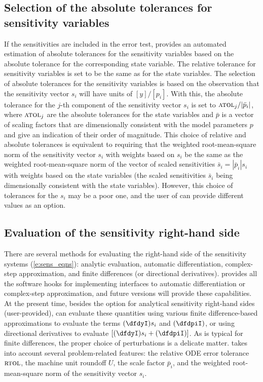 \subsection{Selection of the absolute tolerances for sensitivity variables}
If the sensitivities are included in the error
test, {\cvodes} provides an
automated estimation of absolute tolerances for the sensitivity variables 
based on the absolute tolerance for the corresponding state variable.
The relative tolerance for sensitivity variables is set to be the same as for 
the state variables. The selection of absolute tolerances for the sensitivity 
variables is based on the observation that the sensitivity vector $s_i$ will have 
units of $[y]/[p_i]$.
With this, the absolute tolerance for the $j$-th component of the sensitivity
vector $s_i$ is set to ${\mbox{\sc atol}_j}/{|{\bar p}_i|}$, where
$\mbox{\sc atol}_j$ are the absolute tolerances for the state variables and $\bar p$
is a vector of scaling factors that are dimensionally consistent with
the model parameters $p$ and give an indication of their order of magnitude.
This choice of relative and absolute tolerances is equivalent 
to requiring that the weighted root-mean-square norm of the sensitivity 
vector $s_i$ with weights based on $s_i$ be the same as the
weighted root-mean-square norm of the vector of scaled sensitivities 
${\bar s}_i = |{\bar p}_i| s_i$ with weights based on the state variables
(the scaled sensitivities ${\bar s}_i$ being dimensionally consistent with the
state variables).
%
However, this choice of tolerances for the $s_i$ may be a poor one, and the user 
of {\cvodes} can provide different values as an option.

\subsection{Evaluation of the sensitivity right-hand side}
There are several methods for evaluating the right-hand side of the sensitivity 
systems (\ref{e:sens_eqns}): analytic evaluation, automatic differentiation, 
complex-step approximation, and finite differences (or directional derivatives).
{\cvodes} provides all the software hooks for implementing interfaces to
automatic differentiation or complex-step approximation, and future versions
will provide these capabilities.
At the present time, besides the option for analytical sensitivity right-hand 
sides (user-provided), {\cvodes} can evaluate these quantities using various
finite difference-based approximations to evaluate the terms $(\dfdyI) s_i$ 
and $(\dfdpiI)$, or using directional derivatives to evaluate
$\left[ (\dfdyI) s_i + (\dfdpiI) \right]$.
As is typical for finite differences, the proper choice of perturbations is a 
delicate matter. {\cvodes} takes into account several problem-related features:
the relative ODE error tolerance $\mbox{\sc rtol}$, the machine unit roundoff $U$,
the scale factor ${\bar p}_i$, and the weighted root-mean-square norm of the 
sensitivity vector $s_i$.

